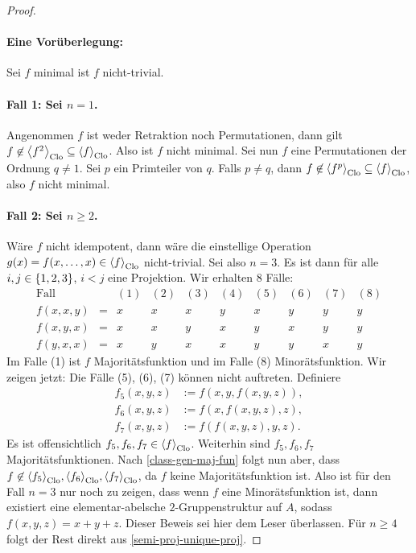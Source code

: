 \documentclass{book}
\begin{document}
\begin{proof}
    \paragraph{Eine Vorüberlegung:} Sei $f$ minimal ist $f$ nicht-trivial.

    \paragraph{Fall 1: Sei $n=1$.} Angenommen $f$ ist weder Retraktion noch Permutationen, dann gilt $f\not\in\gen[\Clo]{f^2}\setleq\gen[\Clo]{f}$. Also ist $f$ nicht minimal. Sei nun $f$ eine Permutationen der Ordnung $q\neq 1$. Sei $p$ ein Primteiler von $q$. Falls $p\neq q$, dann $f\not\in\gen[\Clo]{f^p}\setleq\gen[\Clo]{f}$, also $f$ nicht minimal.

    \paragraph{Fall 2: Sei $n\geq 2$.} 
    Wäre $f$ nicht idempotent, dann wäre die einstellige Operation $g(x)=f(x,\ldots,x)\in\gen{f}_{\Clo}$ nicht-trivial.
    Sei also $n=3$. Es ist dann für alle $i,j\in\left\{1,2,3\right\}$, $i<j$ eine Projektion. Wir erhalten $8$ Fälle:
    $$
    \begin{matrix}
        \textrm{Fall}&  & (1) & (2) & (3) & (4) & (5) & (6) & (7) & (8)\\
        f(x,x,y) & = & x & x & x & y & x & y & y & y\\
        f(x,y,x) & = & x & x & y & x & y & x & y & y\\
        f(y,x,x) & = & x & y & x & x & y & y & x & y
    \end{matrix}
    $$
    Im Falle (1) ist $f$ Majoritätsfunktion und im Falle (8) Minorätsfunktion.
    Wir zeigen jetzt: Die Fälle (5), (6), (7) können nicht auftreten. Definiere
    \begin{align*}
        f_5(x,y,z) &:= f(x,y,f(x,y,z)),\\    
        f_6(x,y,z) &:= f(x,f(x,y,z),z),\\
        f_7(x,y,z) &:= f(f(x,y,z),y,z).    
    \end{align*}
    Es ist offensichtlich $f_5,f_6,f_7\in\gen{f}_{\Clo}$. Weiterhin sind $f_5,f_6,f_7$ Majoritätsfunktionen. Nach \autoref{class-gen-maj-fun} folgt nun aber, dass $f\not\in\gen{f_5}_{\Clo},\gen{f_6}_{\Clo},\gen{f_7}_{\Clo}$, da $f$ keine Majoritätsfunktion ist.
    Also ist für den Fall $n=3$ nur noch zu zeigen, dass wenn $f$ eine Minorätsfunktion ist, dann existiert eine elementar-abelsche $2$-Gruppenstruktur auf $A$, sodass $f(x,y,z)=x+y+z$. Dieser Beweis sei hier dem Leser überlassen. Für $n\geq 4$ folgt der Rest direkt aus \autoref{semi-proj-unique-proj}.
\end{proof}
\end{document}
